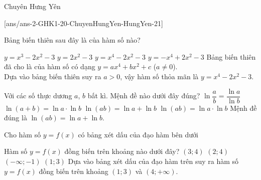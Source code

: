 \begin{name}
	{\tenchude}
	{\tendethi}
	{Chuyên Hưng Yên}
	{\thoigian}
\end{name}
	\setcounter{ex}{0}\setcounter{bt}{0}
	[ans/ans-2-GHK1-20-ChuyenHungYen-HungYen-21]

\begin{ex}%
	Bảng biến thiên sau đây là của hàm số nào?
	\begin{center}
	\end{center}
	\choice
	{$y=x^3-2x^2-3$}
	{$y=2x^2-3$}
	{\True $y=x^4-2x^2-3$}
	{$y=-x^4+2x^2-3$}
	\loigiai
	{
		Bảng biến thiên đã cho là của hàm số có dạng $y=ax^4+bx^2+c$ ($a\ne0$).\\
		Dựa vào bảng biến thiên suy ra $a>0$, vậy hàm số thỏa mãn là $y=x^4-2x^2-3$.
	}
\end{ex}
\begin{ex}%
	Với các số thực dương $a$, $b$ bất kì. Mệnh đề nào dưới đây đúng?
	\choice
	{$\ln\dfrac{a}{b}=\dfrac{\ln a}{\ln b}$}
	{$\ln(a+b)=\ln a\cdot\ln b$}
	{\True $\ln(ab)=\ln a+\ln b$}
	{$\ln(ab)=\ln a\cdot\ln b$}
	\loigiai
	{
		Mệnh đề đúng là $\ln(ab)=\ln a+\ln b$.
	}
\end{ex}
\begin{ex}%
	Cho hàm số $y=f(x)$ có bảng xét dấu của đạo hàm bên dưới
	\begin{center}
	\end{center}
	Hàm số $y=f(x)$ đồng biến trên khoảng nào dưới đây?
	\choice
	{$(3;4)$}
	{$(2;4)$}
	{$(-\infty;-1)$}
	{\True $(1;3)$}
	\loigiai
	{
		Dựa vào bảng xét dấu của đạo hàm trên suy ra hàm số $y=f(x)$ đồng biến trên khoảng $(1;3)$ và $(4;+\infty)$.
	}
\end{ex}
